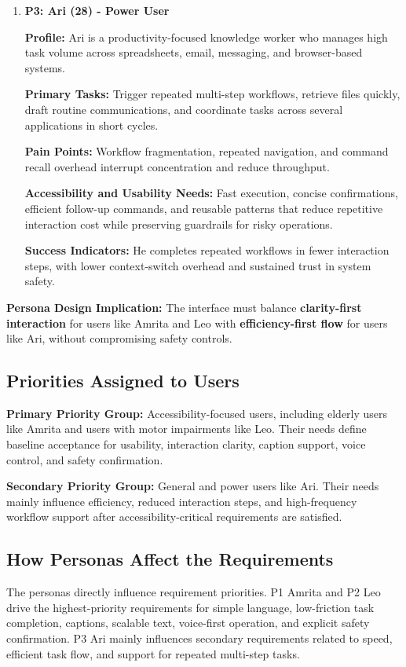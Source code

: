\documentclass[12pt]{article}
\begin{document}
\begin{enumerate}
  \item \textbf{P3: Ari (28) - Power User}

  \textbf{Profile:}
  Ari is a productivity-focused knowledge worker who manages high task
  volume across spreadsheets, email, messaging, and browser-based
  systems.

  \textbf{Primary Tasks:}
  Trigger repeated multi-step workflows, retrieve files quickly,
  draft routine communications, and coordinate tasks across several
  applications in short cycles.

  \textbf{Pain Points:}
  Workflow fragmentation, repeated navigation, and command recall
  overhead interrupt concentration and reduce throughput.

  \textbf{Accessibility and Usability Needs:}
  Fast execution, concise confirmations, efficient follow-up commands,
  and reusable patterns that reduce repetitive interaction cost while
  preserving guardrails for risky operations.

  \textbf{Success Indicators:}
  He completes repeated workflows in fewer interaction steps, with
  lower context-switch overhead and sustained trust in system safety.
\end{enumerate}

\textbf{Persona Design Implication:}
The interface must balance \textbf{clarity-first interaction} for users
like Amrita and Leo with \textbf{efficiency-first flow} for users like
Ari, without compromising safety controls.

\subsection{Priorities Assigned to Users}
\textbf{Primary Priority Group:}
Accessibility-focused users, including elderly users like Amrita and
users with motor impairments like Leo. Their needs define baseline
acceptance for usability, interaction clarity, caption support, voice
control, and safety confirmation.

\textbf{Secondary Priority Group:}
General and power users like Ari. Their needs mainly influence
efficiency, reduced interaction steps, and high-frequency workflow
support after accessibility-critical requirements are satisfied.

\subsection{How Personas Affect the Requirements}
The personas directly influence requirement priorities. P1 Amrita and
P2 Leo drive the highest-priority requirements for simple language,
low-friction task completion, captions, scalable text, voice-first
operation, and explicit safety confirmation. P3 Ari mainly influences
secondary requirements related to speed, efficient task flow, and
support for repeated multi-step tasks.
\end{document}
